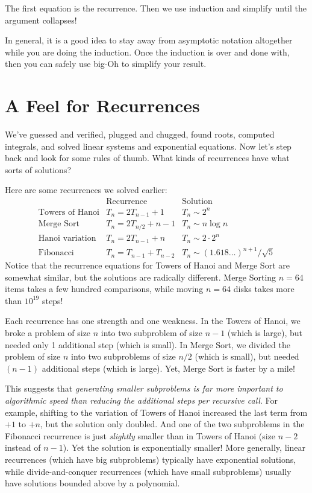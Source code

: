 The first equation is the recurrence.  Then we use induction and
simplify until the argument collapses!

In general, it is a good idea to stay away from asymptotic notation
altogether while you are doing the induction.  Once the induction is
over and done with, then you can safely use big-Oh to simplify your
result.

\section{A Feel for Recurrences}

We've guessed and verified, plugged and chugged, found roots, computed
integrals, and solved linear systems and exponential equations.  Now
let's step back and look for some rules of thumb.  What kinds of
recurrences have what sorts of solutions?

Here are some recurrences we solved earlier:
\[
\begin{array}{lll}
& \text{Recurrence} & \text{Solution} \\
\text{Towers of Hanoi} & T_n = 2 T_{n-1} + 1 & T_n \sim 2^n \\
\text{Merge Sort} & T_n = 2 T_{n/2} + n - 1 & T_n \sim n \log n \\
\text{Hanoi variation} & T_n = 2 T_{n-1} + n & T_n \sim 2 \cdot 2^n \\
\text{Fibonacci} & T_n = T_{n-1} + T_{n-2} & T_n \sim
(1.618\ldots)^{n+1} / \sqrt{5}
\end{array}
\]
Notice that the recurrence equations for Towers of Hanoi and Merge
Sort are somewhat similar, but the solutions are radically different.
Merge Sorting $n = 64$ items takes a few hundred comparisons, while
moving $n = 64$ disks takes more than $10^{19}$ steps!

Each recurrence has one strength and one weakness. In the Towers of
Hanoi, we broke a problem of size $n$ into two subproblem of size $n -
1$ (which is large), but needed only 1 additional step (which is
small). In Merge Sort, we divided the problem of size $n$ into two
subproblems of size $n/2$ (which is small), but needed $(n - 1)$
additional steps (which is large). Yet, Merge Sort is faster by a
mile!

This suggests that \emph{generating smaller subproblems is far more
  important to algorithmic speed than reducing the additional steps
  per recursive call}.  For example, shifting to the variation of
Towers of Hanoi increased the last term from $+1$ to $+n$, but the
solution only doubled.  And one of the two subproblems in the
Fibonacci recurrence is just \emph{slightly} smaller than in Towers of
Hanoi (size $n -2$ instead of $n-1$).  Yet the solution is
exponentially smaller!  More generally, linear recurrences (which have
big subproblems) typically have exponential solutions, while
divide-and-conquer recurrences (which have small subproblems) usually
have solutions bounded above by a polynomial.

